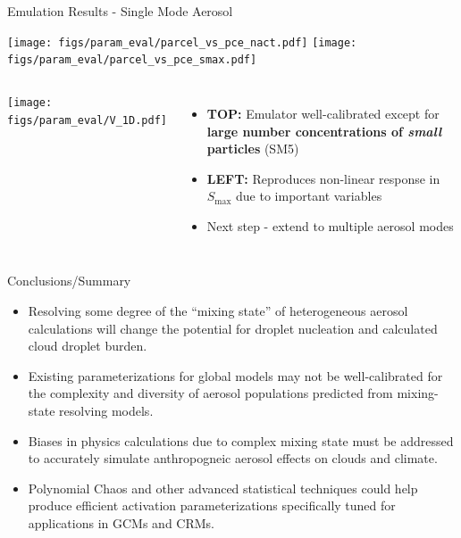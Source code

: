 \documentclass[9pt,pdf,mathserif]{beamer}
\begin{document}
\begin{frame}{Emulation Results - Single Mode Aerosol}
\begin{center}
\vspace{-0.75cm}
\texttt{[image: figs/param\_eval/parcel\_vs\_pce\_nact.pdf]}
\texttt{[image: figs/param\_eval/parcel\_vs\_pce\_smax.pdf]}
\end{center}
\vspace{-0.5cm}
\begin{columns}
		\centering
		\vspace{-0.75cm}
		\texttt{[image: figs/param\_eval/V\_1D.pdf]}
		\begin{itemize}
			\item<1-> \textbf{TOP:} Emulator  well-calibrated except for \textbf{large number concentrations of \emph{small} particles} (SM5)
			\item<1-> \textbf{LEFT:} Reproduces non-linear response in $S_\text{max}$ due to important variables
			\item<2-> \alert{Next step - extend to multiple aerosol modes}
		\end{itemize}
\end{columns}
\end{frame}

\begin{frame}{Conclusions/Summary}
\begin{itemize}
	\item<1-> Resolving some degree of the ``mixing state'' of heterogeneous aerosol calculations will change the potential for droplet nucleation and calculated cloud droplet burden.
	\vspace{0.5cm}
	\item<1-> Existing parameterizations for global models may not be well-calibrated for the complexity and diversity of aerosol populations predicted from mixing-state resolving models.
	\vspace{0.5cm}
	\item<2-> \alert{Biases in physics calculations due to complex mixing state must be addressed to accurately simulate anthropogneic aerosol effects on clouds and climate.}
	\vspace{0.5cm}
	\item<3-> Polynomial Chaos and other advanced statistical techniques could help produce efficient activation parameterizations specifically tuned for applications in GCMs and CRMs.
\end{itemize}
\end{frame}
\end{document}
